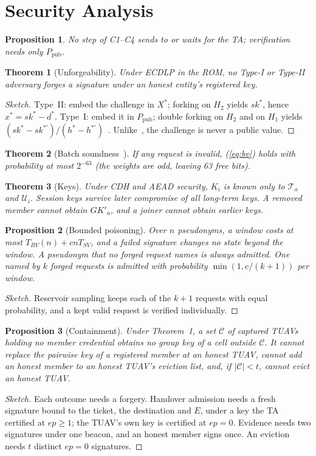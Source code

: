\documentclass[conference]{IEEEtran}
\newcommand{\Ppub}{P_{\mathrm{pub}}}
\newcommand{\GK}{\mathit{GK}}
\newcommand{\sk}{\mathit{sk}}
\newcommand{\ep}{\mathit{ep}}
\newtheorem{theorem}{Theorem}
\newtheorem{proposition}{Proposition}
\begin{document}
\section{Security Analysis}\label{sec:security}
\begin{proposition}
No step of C1--C4 sends to or waits for the TA; verification needs only $\Ppub$.
\end{proposition}
\begin{theorem}[Unforgeability]
Under ECDLP in the ROM, no Type-I or Type-II adversary forges a signature under an honest entity's registered key.
\end{theorem}
\begin{proof}[Sketch]
Type~II: embed the challenge in $X^*$; forking on $H_2$ yields $\sk^*$, hence $x^*=\sk^*-d^*$. Type~I: embed it in $\Ppub$; double forking on $H_2$ and
on $H_1$ yields $(\sk^*-\sk^{*\prime})/(h^*-h^{*\prime})$~\cite{forking}. Unlike~\cite{base}, the challenge is never a public value.
\end{proof}
\begin{theorem}[Batch soundness~\cite{bgr}]
If any request is invalid, (\ref{eq:bv}) holds with probability at most $2^{-63}$ (the weights are odd, leaving 63 free bits).
\end{theorem}
\begin{theorem}[Keys]
Under CDH and AEAD security, $K_i$ is known only to $\mathcal T_a$ and $\mathcal U_i$. Session keys survive later compromise of all long-term keys. A removed
member cannot obtain $\GK'_a$, and a joiner cannot obtain earlier keys.
\end{theorem}
\begin{proposition}[Bounded poisoning]
Over $n$ pseudonyms, a window costs at most $T_{BV}(n)+cnT_{SV}$, and a failed signature changes no state beyond the window. A pseudonym that no forged request names is
always admitted. One named by $k$ forged requests is admitted with probability $\min(1,c/(k+1))$ per window.
\end{proposition}
\begin{proof}[Sketch]
Reservoir sampling keeps each of the $k+1$ requests with equal probability, and a kept valid request is verified individually.
\end{proof}
\begin{proposition}[Containment]\label{prop:contain}
Under Theorem~1, a set $\mathcal C$ of captured TUAVs holding no member credential obtains no group key of a cell outside $\mathcal C$. It cannot replace the pairwise key of a
registered member at an honest TUAV, cannot add an honest member to an honest TUAV's eviction list, and, if $|\mathcal C|<t$, cannot evict an honest TUAV.
\end{proposition}
\begin{proof}[Sketch]
Each outcome needs a forgery. Handover admission needs a fresh signature bound to the ticket, the destination and $E$, under a key the TA certified at $\ep\ge1$; the TUAV's
own key is certified at $\ep=0$. Evidence needs two signatures under one beacon, and an honest member signs once. An eviction needs $t$ distinct $\ep=0$ signatures.
\end{proof}
\end{document}
